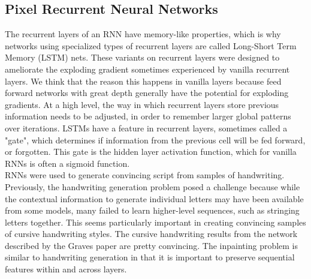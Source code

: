 \documentclass[10pt,twocolumn,letterpaper]{article}
\begin{document}
\subsection{Pixel Recurrent Neural Networks}
The recurrent layers of an RNN have memory-like properties, which is why networks using specialized types of recurrent layers are called Long-Short Term Memory (LSTM) nets. These variants on recurrent layers were designed to ameliorate the exploding gradient sometimes experienced by vanilla recurrent layers. We think that the reason this happens in vanilla layers because feed forward networks with great depth generally have the potential for exploding gradients. At a high level, the way in which recurrent layers store previous information needs to be adjusted, in order to remember larger global patterns over iterations. LSTMs have a feature in recurrent layers, sometimes called a "gate", which determines if information from the previous cell will be fed forward, or forgotten. This gate is the hidden layer activation function, which for vanilla RNNs is often a sigmoid function. \cite{handwritingRNN}\\

RNNs were used to generate convincing script from samples of handwriting. Previously, the handwriting generation problem posed a challenge because while the contextual information to generate individual letters may have been available from some models, many failed to learn higher-level sequences, such as stringing letters together. \cite{handwritingRNN} This seems particularly important in creating convincing samples of cursive handwriting styles. The cursive handwriting results from the network described by the Graves paper are pretty convincing. The inpainting problem is similar to handwriting generation in that it is important to preserve sequential features within and across layers.\\
\end{document}
